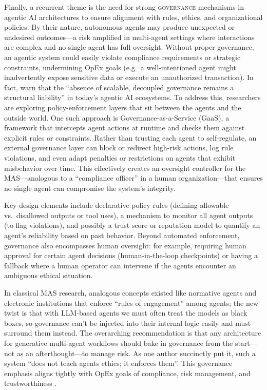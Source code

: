 Finally, a recurrent theme is the need for strong \textsc{governance} mechanisms in agentic AI architectures to ensure alignment with rules, ethics, and organizational policies. By their nature, autonomous agents may produce unexpected or undesired outcomes—a risk amplified in multi-agent settings where interactions are complex and no single agent has full oversight. Without proper governance, an agentic system could easily violate compliance requirements or strategic constraints, undermining OpEx goals (e.g.~a well-intentioned agent might inadvertently expose sensitive data or execute an unauthorized transaction). In fact, \textcite{gauravGovernance2025} warn that the \enquote{absence of scalable, decoupled governance remains a structural liability} in today's agentic AI ecosystems. To address this, researchers are exploring policy-enforcement layers that sit between the agents and the outside world. One such approach is Governance-as-a-Service (GaaS), %
 a framework that intercepts agent actions at runtime and checks them against explicit rules or constraints. Rather than trusting each agent to self-regulate, an external governance layer can block or redirect high-risk actions, log rule violations, and even adapt penalties or restrictions on agents that exhibit misbehavior over time. This effectively creates an oversight controller for the MAS—analogous to a \enquote{compliance officer} in a human organization—that ensures no single agent can compromise the system's integrity.
 
 Key design elements include declarative policy rules (defining allowable vs.~disallowed outputs or tool uses), a mechanism to monitor all agent outputs (to flag violations), and possibly a trust score or reputation model to quantify an agent's reliability based on past behavior. Beyond automated enforcement, governance also encompasses human oversight: for example, requiring human approval for certain agent decisions (human-in-the-loop checkpoints) or having a fallback where a human operator can intervene if the agents encounter an ambiguous ethical situation.
 
 In classical MAS research, analogous concepts existed like normative agents and electronic institutions that enforce “rules of engagement” among agents; the new twist is that with LLM-based agents we must often treat the models as black boxes, so governance can't be injected into their internal logic easily and must surround them instead. The overarching recommendation is that any architecture for generative multi-agent workflows should bake in governance from the start—not as an afterthought—to manage risk. As one author succinctly put it, such a system “does not teach agents ethics; it enforces them”. This governance emphasis aligns tightly with OpEx goals of compliance, risk management, and trustworthiness \parencite{gauravGovernance2025}.

